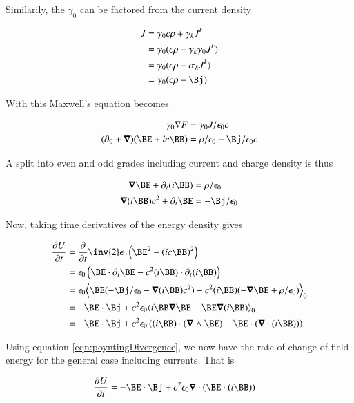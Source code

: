 \documentclass{article}
\begin{document}
Similarily, the $\gamma_0$ can be factored from the current density

\begin{align*}
J 
&= \gamma_0 c \rho + \gamma_k J^k \\
&= \gamma_0 (c \rho - \gamma_k \gamma_0 J^k) \\
&= \gamma_0 (c \rho - \sigma_k J^k) \\
&= \gamma_0 (c \rho - \Bj )
\end{align*}

With this Maxwell's equation becomes
 
\begin{align*}
\gamma_0 \grad F &= \gamma_0 J / \epsilon_0 c \\
(\partial_0 + \spacegrad) ( \BE + i c \BB ) &= \rho/\epsilon_0 - \Bj/\epsilon_0 c \\
\end{align*}
 
A split into even and odd grades including current and charge density is thus
 
\begin{align*}
\spacegrad \BE + \partial_t (i \BB) &= \rho/\epsilon_0 \\
\spacegrad (i \BB) c^2 + \partial_t \BE &= -\Bj/\epsilon_0
\end{align*}
 
Now, taking time derivatives of the energy density gives

\begin{align*}
\PD{t}{U} 
&= \PD{t}{}\inv{2} \epsilon_0 \left( \BE^2 - (ic \BB)^2 \right) \\
&= \epsilon_0 \left( \BE \cdot \partial_t \BE - c^2 (i\BB) \cdot \partial_t (i\BB) \right) \\
&= \epsilon_0 \gpgradezero{ \BE ( -\Bj/\epsilon_0 -\spacegrad (i \BB) c^2 ) - c^2 (i\BB) ( -\spacegrad \BE + \rho/\epsilon_0 ) } \\
&= -\BE \cdot \Bj + c^2 \epsilon_0 \gpgradezero{ i\BB \spacegrad \BE -\BE \spacegrad (i \BB) } \\
&= -\BE \cdot \Bj + c^2 \epsilon_0 \left( (i\BB) \cdot (\spacegrad \wedge \BE) - \BE \cdot (\spacegrad \cdot (i \BB)) \right) \\
\end{align*}

Using equation \ref{eqn:poyntingDivergence}, we now have the rate of change of
field energy for the general case including currents.  That is

\begin{align}
\PD{t}{U} &= -\BE \cdot \Bj + c^2 \epsilon_0 \spacegrad \cdot (\BE \cdot (i\BB)) 
\end{align}
\end{document}
